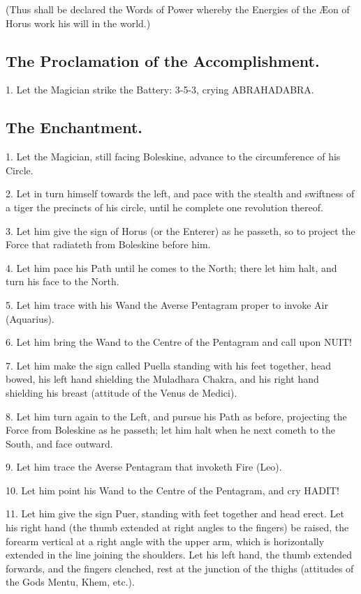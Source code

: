 (Thus shall be declared the Words of Power whereby the Energies of the \AE{}on of Horus work his will in the world.)

\subsection*{The Proclamation of the Accomplishment.}

1. Let the Magician strike the Battery: 3-5-3, crying ABRAHADABRA.

\subsection*{The Enchantment.}

1. Let the Magician, still facing Boleskine, advance to the circumference of his Circle.

2. Let in turn himself towards the left, and pace with the stealth and swiftness of a tiger the precincts of his circle, until he complete one revolution thereof.

3. Let him give the sign of Horus (or the Enterer) as he passeth, so to project the Force that radiateth from Boleskine before him.

4. Let him pace his Path until he comes to the North; there let him halt, and turn his face to the North.

5. Let him trace with his Wand the Averse Pentagram proper to invoke Air (Aquarius).

6. Let him bring the Wand to the Centre of the Pentagram and call upon NUIT!

7. Let him make the sign called Puella standing with his feet together, head bowed, his left hand shielding the Muladhara Chakra, and his right hand shielding his breast (attitude of the Venus de Medici).

8. Let him turn again to the Left, and pursue his Path as before, projecting the Force from Boleskine as he passeth; let him halt when he next cometh to the South, and face outward.

9. Let him trace the Averse Pentagram that invoketh Fire (Leo).

10. Let him point his Wand to the Centre of the Pentagram, and cry HADIT!

11. Let him give the sign Puer, standing with feet together and head erect. Let his right hand (the thumb extended at right angles to the fingers) be raised, the forearm vertical at a right angle with the upper arm, which is horizontally extended in the line joining the shoulders. Let his left hand, the thumb extended forwards, and the fingers clenched, rest at the junction of the thighs (attitudes of the Gods Mentu, Khem, etc.).

